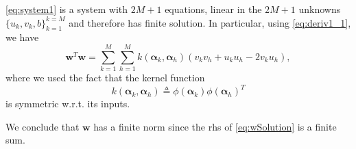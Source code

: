 \documentclass[draftcls,onecolumn,12pt]{IEEEtran}
\newcommand{\wrt}{w.r.t. }
\begin{document}
	\eqref{eq:system1} is a system with $2M + 1$ equations, linear in the $2M + 1$ unknowns $\{u_k,v_k,b\}_{k=1}^{k=M}$ and therefore has finite solution. In particular, using \eqref{eq:deriv1_1}, we have
	\begin{equation}
	\label{eq:wSolution}
	\bm{w}^T\bm{w} =  \sum_{k=1}^{M} \sum_{h=1}^{M} k(\bm{\alpha}_k,\bm{\alpha}_h) (v_kv_h + u_ku_h -2 v_ku_h),
	\end{equation}
	where we used the fact that the kernel function
	\begin{equation}
	k(\bm{\alpha}_k,\bm{\alpha}_h) \triangleq \phi(\bm{\alpha}_k) \phi(\bm{\alpha}_h)^T
	\end{equation}
	 is symmetric \wrt its inputs. 
	
	
	We conclude that $\bm{w}$ has a finite norm since the rhs of \eqref{eq:wSolution} is a finite sum.
	 
\newpage 



%
%
\renewcommand*{\bibfont}{\footnotesize}

\printbibliography
\end{document}
